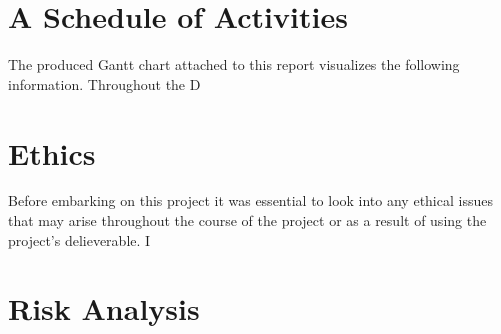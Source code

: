\documentclass{report}
\begin{document}
\section{A Schedule of Activities}
The produced Gantt chart attached to this report visualizes the following information. Throughout the 
D
\section{Ethics}
Before embarking on this project it was essential to look into any ethical issues that may arise throughout the course of the project or as a result of using the project's delieverable. I 

\section{Risk Analysis}


%



\end{document}
